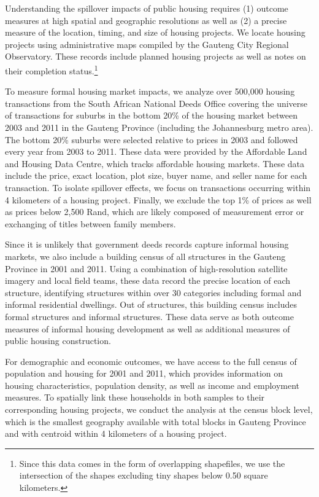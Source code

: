 \documentclass[12pt]{article}
\begin{document}
Understanding the spillover impacts of public housing requires (1) outcome measures at high spatial and geographic resolutions as well as (2) a precise measure of the location, timing, and size of housing projects.  We locate housing projects using administrative maps compiled by the Gauteng City Regional Observatory.  These records include planned housing projects as well as notes on their completion status.\footnote{Since this data comes in the form of overlapping shapefiles, we use the intersection of the shapes excluding tiny shapes below 0.50 square kilometers.}  

To measure formal housing market impacts, we analyze over 500,000 housing transactions from the South African National Deeds Office covering the universe of transactions for suburbs in the bottom 20\% of the housing market between 2003 and 2011 in the Gauteng Province (including the Johannesburg metro area).  The bottom 20\% suburbs were selected relative to prices in 2003 and followed every year from 2003 to 2011.  These data were provided by the Affordable Land and Housing Data Centre, which tracks affordable housing markets.  These data include the price, exact location, plot size, buyer name, and seller name for each transaction.  To isolate spillover effects, we focus on transactions occurring within 4 kilometers of a housing project.  Finally, we exclude the top 1\% of prices as well as prices below 2,500 Rand, which are likely composed of measurement error or exchanging of titles between family members.

Since it is unlikely that government deeds records capture informal housing markets, we also include a building census of all structures in the Gauteng Province in 2001 and 2011.  Using a combination of high-resolution satellite imagery and local field teams, these data record the precise location of each structure, identifying structures within over 30 categories including formal and informal residential dwellings.  Out of structures, this building census includes formal structures and informal structures.  These data serve as both outcome measures of informal housing development as well as additional measures of public housing construction.

For demographic and economic outcomes, we have access to the full census of population and housing for 2001 and 2011, which provides information on housing characteristics, population density, as well as income and employment measures.   To spatially link these households in both samples to their corresponding housing projects, we conduct the analysis at the census block level, which is the smallest geography available with total blocks in Gauteng Province and with centroid within 4 kilometers of a housing project.
\end{document}
